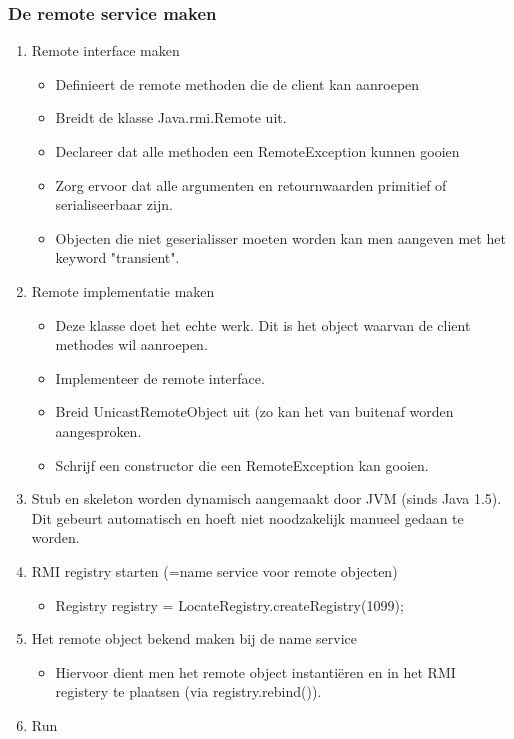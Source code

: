 \documentclass[a4paper,12pt]{article}
\begin{document}
\subsubsection{De remote service maken}
\begin{enumerate}
\item Remote interface maken
	\begin{itemize}
	\item Definieert de remote methoden die de client kan aanroepen
	\item Breidt de klasse Java.rmi.Remote uit.
	\item Declareer dat alle methoden een RemoteException kunnen gooien
	\item Zorg ervoor dat alle argumenten en retournwaarden primitief of serialiseerbaar zijn.
	\item Objecten die niet geserialisser moeten worden kan men aangeven met het keyword "transient".
	\end{itemize}
\item Remote implementatie maken
	\begin{itemize}
	\item Deze klasse doet het echte werk.
	Dit is het object waarvan de client methodes wil aanroepen.
	\item Implementeer de remote interface.
	\item Breid UnicastRemoteObject uit (zo kan het van buitenaf worden aangesproken.
	\item Schrijf een constructor die een RemoteException kan gooien.
	\end{itemize}
\item Stub en skeleton worden dynamisch aangemaakt door JVM (sinds Java 1.5).
Dit gebeurt automatisch en hoeft niet noodzakelijk manueel gedaan te worden.
\item RMI registry starten (=name service voor remote objecten)
	\begin{itemize}
	\item Registry registry = LocateRegistry.createRegistry(1099);
	\end{itemize}
\item Het remote object bekend maken bij de name service
	\begin{itemize}
	\item Hiervoor dient men het remote object instantiëren en in het RMI registery te plaatsen (via registry.rebind()).
	\end{itemize}
\item Run
\end{enumerate}
\end{document}
